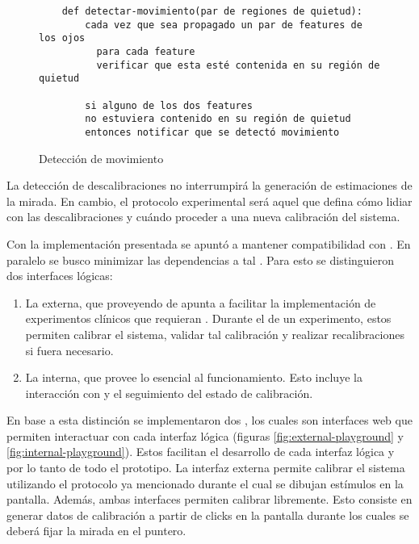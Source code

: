   \begin{figure}
    \begin{verbatim}
    def detectar-movimiento(par de regiones de quietud):
        cada vez que sea propagado un par de features de los ojos
          para cada feature
          verificar que esta esté contenida en su región de quietud

        si alguno de los dos features
        no estuviera contenido en su región de quietud
        entonces notificar que se detectó movimiento\end{verbatim}
    \caption{Detección de movimiento}
    \label{fig:movement-detection}
  \end{figure}

  La detección de descalibraciones no interrumpirá la generación de
  estimaciones de la mirada.
  En cambio, el protocolo experimental será aquel que defina cómo lidiar con
  las descalibraciones y cuándo proceder a una nueva calibración del sistema.

  Con la implementación presentada se apuntó a mantener compatibilidad con
  \jspsych.
  En paralelo se busco minimizar las dependencias a tal \framework.
  Para esto se distinguieron dos interfaces lógicas:
  \begin{enumerate}
    \item
      La externa, que proveyendo \timelines de \jspsych apunta a facilitar la
      implementación de experimentos clínicos que requieran \eyetracking.
      Durante el \runtime de un experimento, estos permiten calibrar el
      sistema, validar tal calibración y realizar recalibraciones si fuera
      necesario.
    \item
      La interna, que provee lo esencial al funcionamiento.
      Esto incluye la interacción con \webgazer y el seguimiento del estado de
      calibración.
  \end{enumerate}
  En base a esta distinción se implementaron dos \playgrounds, los cuales son
  interfaces web que permiten interactuar con cada interfaz lógica (figuras
  \ref{fig:external-playground} y \ref{fig:internal-playground}).
  Estos facilitan el desarrollo de cada interfaz lógica y por lo tanto de todo
  el prototipo.
  La interfaz externa permite calibrar el sistema utilizando el protocolo ya
  mencionado durante el cual se dibujan estímulos en la pantalla.
  Además, ambas interfaces permiten calibrar libremente.
  Esto consiste en generar datos de calibración a partir de clicks en la
  pantalla durante los cuales se deberá fijar la mirada en el puntero.

